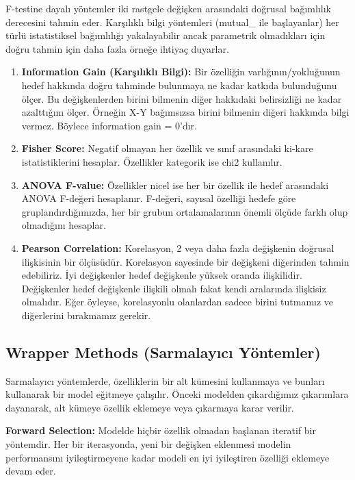 F-testine dayalı yöntemler iki rastgele değişken arasındaki doğrusal bağımlılık derecesini tahmin eder. Karşılıklı bilgi yöntemleri (mutual\_ ile başlayanlar) her türlü istatistiksel bağımlılığı yakalayabilir ancak parametrik olmadıkları için doğru tahmin için daha fazla örneğe ihtiyaç duyarlar.

\begin{enumerate}
    \item \textbf{Information Gain (Karşılıklı Bilgi):} Bir özelliğin varlığının/yokluğunun hedef hakkında doğru tahminde bulunmaya ne kadar katkıda bulunduğunu ölçer. Bu değişkenlerden birini bilmenin diğer hakkıdaki belirsizliği ne kadar azalttığını ölçer. Örneğin X-Y bağımsızsa birini bilmenin diğeri hakkında bilgi vermez. Böylece information gain = 0'dır.
    \item \textbf{Fisher Score:} Negatif olmayan her özellik ve sınıf arasındaki ki-kare istatistiklerini hesaplar. Özellikler kategorik ise chi2 kullanılır.
    \item \textbf{ANOVA F-value:} Özellikler nicel ise her bir özellik ile hedef arasındaki ANOVA F-değeri hesaplanır. F-değeri, sayısal özelliği hedefe göre gruplandırdığımızda, her bir grubun ortalamalarının önemli ölçüde farklı olup olmadığını hesaplar.
    \item \textbf{Pearson Correlation:} Korelasyon, 2 veya daha fazla değişkenin doğrusal ilişkisinin bir ölçüsüdür. Korelasyon sayesinde bir değişkeni diğerinden tahmin edebiliriz. İyi değişkenler hedef değişkenle yüksek oranda ilişkilidir. Değişkenler hedef değişkenle ilişkili olmalı fakat kendi aralarında ilişkisiz olmalıdır. Eğer öyleyse, korelasyonlu olanlardan sadece birini tutmamız ve diğerlerini bırakmamız gerekir.
\end{enumerate}

\newpage

\subsection{Wrapper Methods (Sarmalayıcı Yöntemler)}
Sarmalayıcı yöntemlerde, özelliklerin bir alt kümesini kullanmaya ve bunları kullanarak bir model eğitmeye çalışılır. Önceki modelden çıkardığımız çıkarımlara dayanarak, alt kümeye özellik eklemeye veya çıkarmaya karar verilir.

\textbf{Forward Selection:} Modelde hiçbir özellik olmadan başlanan iteratif bir yöntemdir. Her bir iterasyonda, yeni bir değişken eklenmesi modelin performansını iyileştirmeyene kadar modeli en iyi iyileştiren özelliği eklemeye devam eder.

